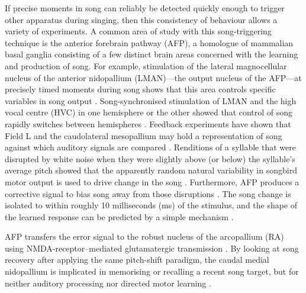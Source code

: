 \documentclass[10pt,letterpaper]{article}
\begin{document}
If precise moments in song can reliably be detected quickly enough to
trigger other apparatus during singing, then this consistency of
behaviour allows a variety of experiments.  A common area of study
with this song-triggering technique is the anterior forebrain pathway
(AFP), a homologue of mammalian basal ganglia consisting of a few
distinct brain areas concerned with the learning and production of
song.  For example, stimulation of the lateral magnocellular nucleus
of the anterior nidopallium (LMAN)---the output nucleus of the
AFP---at precisely timed moments during song shows that this area
controls specific variables in song output \cite{Kao2005}.
Song-synchronised stimulation of LMAN and the high vocal centre (HVC)
in one hemisphere or the other showed that control of song rapidly
switches between hemispheres \cite{Wang2008interhemispheric}.
Feedback experiments have shown that Field L and the caudolateral
mesopallium may hold a representation of song against which auditory
signals are compared \cite{Keller2009}.  Renditions of a syllable that
were disrupted by white noise when they were slightly above (or below)
the syllable's average pitch showed that the apparently random natural
variability in songbird motor output is used to drive change in the
song \cite{Tumer2007pitchshift}. Furthermore, AFP produces a
corrective signal to bias song away from those disruptions
\cite{Andalman2009}. The
song change is isolated to within roughly 10 milliseconds (ms) of the
stimulus, and the shape of the learned response can be predicted by
a simple mechanism \cite{Charlesworth2011learning}.


AFP transfers the error signal to
the robust nucleus of the arcopallium (RA) using
NMDA-receptor--mediated glutamatergic transmission \cite{Warren2011}. By looking at song
recovery after applying the same pitch-shift paradigm,
the caudal medial nidopallium is
implicated in memorising or recalling a recent song target, but for
neither auditory processing nor directed motor learning \cite{Canopoli2014}.

\end{document}
